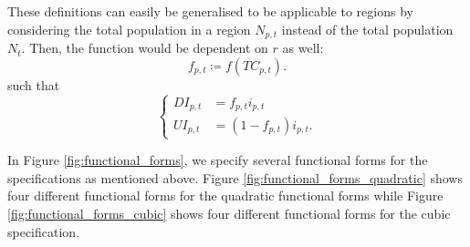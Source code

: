 \documentclass[12pt]{article}
\begin{document}
	These definitions can easily be generalised to be applicable to regions by considering the total population in a region $N_{p,t}$ instead of the total population $N_t$. Then, the function would be dependent on $r$ as well: 
	\begin{equation} \label{eq:f_rt}
	f_{p,t} \coloneqq f(TC_{p,t}).
	\end{equation}
	such that
	\begin{equation*}
	    \begin{cases}
	        DI_{p,t} &= f_{p,t}i_{p,t} \\
	        UI_{p,t} &= (1-f_{p,t})i_{p,t}.
	    \end{cases}
	\end{equation*}
	
	In Figure \ref{fig:functional_forms}, we specify several functional forms for the specifications as mentioned above. Figure \ref{fig:functional_forms_quadratic} shows four different functional forms for the quadratic functional forms while Figure \ref{fig:functional_forms_cubic} shows four different functional forms for the cubic specification. \\
	
	\def\N{100}
	\def\fmin{0.1}
	
\end{document}
